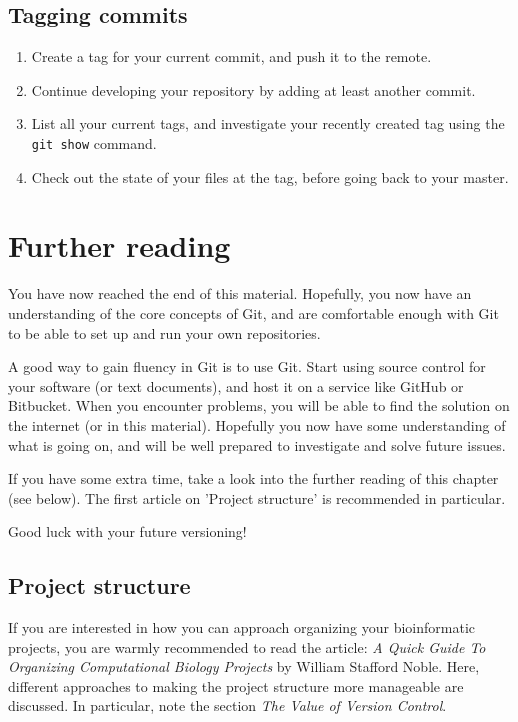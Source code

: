 \documentclass[../main/git_course_main.tex]{subfiles}
\begin{document}
\subsection{Tagging commits}

\begin{enumerate}
	\item Create a tag for your current commit, and push it to the remote.
	\item Continue developing your repository by adding at least another commit.
	\item List all your current tags, and investigate your recently created tag using the \verb$git show$ command.
	\item Check out the state of your files at the tag, before going back to your master.
\end{enumerate}

\newpage
\section{Further reading}

You have now reached the end of this material. Hopefully, you now have an understanding
of the core concepts of Git, and are comfortable enough with Git to be able to set up and run your own repositories.

A good way to gain fluency in Git is to use Git. Start using source control for your
software (or text documents), and host it on a service like GitHub or Bitbucket. When you encounter problems, you will be able to find the solution on the internet (or in this material). Hopefully you now have some understanding of what is going on, and will be well prepared to investigate and solve future issues.

If you have some extra time, take a look into the further reading of this chapter (see below).
The first article on 'Project structure' is recommended in particular.

Good luck with your future versioning!

\subsection{Project structure}

If you are interested in how you can approach
organizing your bioinformatic projects, you are warmly recommended to read the article: \textit{A Quick Guide To Organizing Computational Biology Projects}
by William Stafford Noble. Here, different approaches to making the project structure more manageable are discussed. In particular, note the section
\textit{The Value of Version Control}. \\
\end{document}
